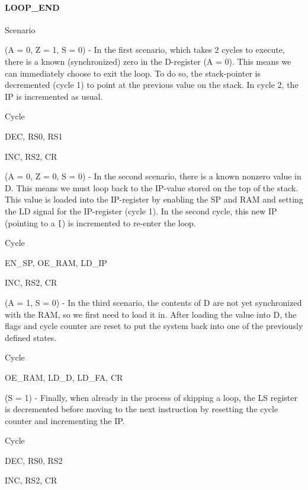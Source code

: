 \paragraph{LOOP\_END}
  \begin{labeledenum}{Scenario}
  \item (A = 0, Z = 1, S = 0) - In the first scenario, which takes 2 cycles to execute, there is a known (synchronized) zero in the D-register (A = 0). This means we can immediately choose to exit the loop. To do so, the stack-pointer is decremented (cycle 1) to point at the previous value on the stack. In cycle 2, the IP is incremented as usual.
    
    \begin{labeledenum}{Cycle}
    \item DEC, RS0, RS1  
    \item INC, RS2, CR
    \end{labeledenum}

  \item (A = 0, Z = 0, S = 0) - In the second scenario, there is a known nonzero value in D. This means we must loop back to the IP-value stored on the top of the stack. This value is loaded into the IP-register by enabling the SP and RAM and setting the LD signal for the IP-register (cycle 1). In the second cycle, this new IP (pointing to a \texttt{[}) is incremented to re-enter the loop.
    
      \begin{labeledenum}{Cycle}
      \item EN\_SP, OE\_RAM, LD\_IP
      \item INC, RS2, CR
      \end{labeledenum}
      
    \item (A = 1, S = 0) - In the third scenario, the contents of D are not yet synchronized with the RAM, so we first need to load it in. After loading the value into D, the flags and cycle counter are reset to put the system back into one of the previously defined states.

      \begin{labeledenum}{Cycle}
      \item OE\_RAM, LD\_D, LD\_FA, CR
      \end{labeledenum}
      
    \item (S = 1) - Finally, when already in the process of skipping a loop, the LS register is decremented before moving to the next instruction by resetting the cycle counter and incrementing the IP.
      
      \begin{labeledenum}{Cycle}
      \item DEC, RS0, RS2
      \item INC, RS2, CR
      \end{labeledenum}
  \end{labeledenum}

